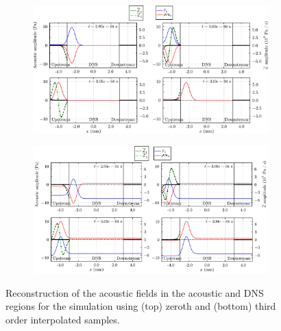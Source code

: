 \begin{figure}[t]
\begin{subfigure}{0.99\textwidth}
\centering
\includegraphics[scale=0.31]{assets/graphs/ac_frames_order=0.pdf}
\caption{}
\label{fig:ac-reconstruct_order0}
\end{subfigure}

\vspace{0.5em}

\begin{subfigure}{0.99\textwidth}
\centering
\includegraphics[scale=0.31]{assets/graphs/ac_frames.pdf}
\caption{}
\label{fig:ac-reconstruct_order3}
\end{subfigure}
\caption{Reconstruction of the acoustic fields in the acoustic and DNS regions for the simulation using (top) zeroth and (bottom) third order interpolated samples.}
\label{fig:ac-reconstruct}
\end{figure}

